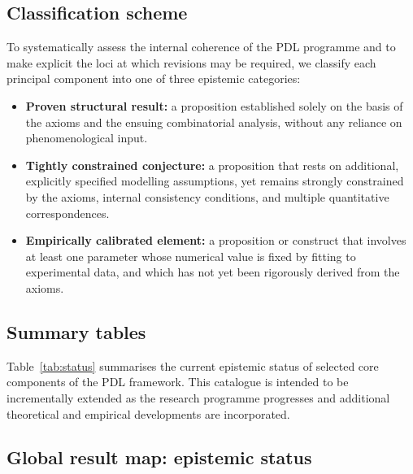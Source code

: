 \documentclass{article}
\begin{document}
\subsection{Classification scheme}
\label{subsec:classification_scheme}

To systematically assess the internal coherence of the PDL programme and to make explicit the loci at which revisions may be required, we classify each principal component into one of three epistemic categories:
\begin{itemize}[leftmargin=1.5em]
  \item \textbf{Proven structural result:} a proposition established solely on the basis of the axioms and the ensuing combinatorial analysis, without any reliance on phenomenological input.
  \item \textbf{Tightly constrained conjecture:} a proposition that rests on additional, explicitly specified modelling assumptions, yet remains strongly constrained by the axioms, internal consistency conditions, and multiple quantitative correspondences.
  \item \textbf{Empirically calibrated element:} a proposition or construct that involves at least one parameter whose numerical value is fixed by fitting to experimental data, and which has not yet been rigorously derived from the axioms.
\end{itemize}

\subsection{Summary tables}
\label{subsec:summary_tables}

Table~\ref{tab:status} summarises the current epistemic status of selected core components of the PDL framework. This catalogue is intended to be incrementally extended as the research programme progresses and additional theoretical and empirical developments are incorporated.

\setlength{\LTpre}{18pt}
\setlength{\LTpost}{0pt}

\subsection{Global result map: epistemic status}
\label{subsec:global_status}
\end{document}
